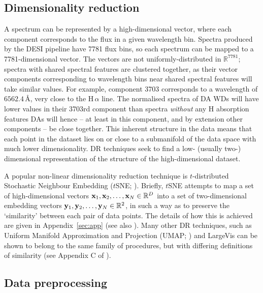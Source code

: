 \documentclass[fleqn,usenatbib]{mnras}
\def\xb{\vb{x}}
\def\yb{\vb{y}}
\begin{document}
\subsection{Dimensionality reduction}

A spectrum can be represented by a high-dimensional vector, where each component corresponds to the flux in a given wavelength bin.
Spectra produced by the DESI pipeline have 7781 flux bins, so each spectrum can be mapped to a 7781-dimensional vector.
The vectors are not uniformly-distributed in $\mathbb{R}^{7781}$;
spectra with shared spectral features are clustered together, as their vector components corresponding to wavelength bins near shared spectral features will take similar values.
For example, component 3703 corresponds to a wavelength of $6562.4\,\text{\AA}$, very close to the H$\,\alpha$ line.
The normalised spectra of DA WDs will have lower values in their 3703rd component than spectra \textit{without} any H absorption features
DAs will hence -- at least in this component, and by extension other components -- be close together.
This inherent structure in the data means that each point in the dataset lies on or close to a submanifold of the data space with much lower dimensionality. DR techniques seek to find a low- (usually two-) dimensional representation of the structure of the high-dimensional dataset.

A popular non-linear dimensionality reduction technique is $t$-distributed Stochastic Neighbour Embedding ($t$SNE; \citealt{tsne}).
Briefly, $t$SNE attempts to map a set of high-dimensional vectors $\xb_1, \xb_2, \dots, \xb_N \in \mathbb{R}^D$ into a set of two-dimensional embedding vectors $\yb_1, \yb_2, \dots, \yb_N \in \mathbb{R}^2$, in such a way as to preserve the `similarity' between each pair of data points.
The details of how this is achieved are given in Appendix~\ref{sec:app} (see also \citealt{tsne}).
Many other DR techniques, such as Uniform Manifold Approximation and Projection (UMAP; \citealt{umap}) and LargeVis \citep{largevis} can be shown to belong to the same family of procedures, but with differing definitions of similarity (see Appendix C of \citealt{umap}).


\subsection{Data preprocessing}
\label{sec:preprocessing}
\end{document}
